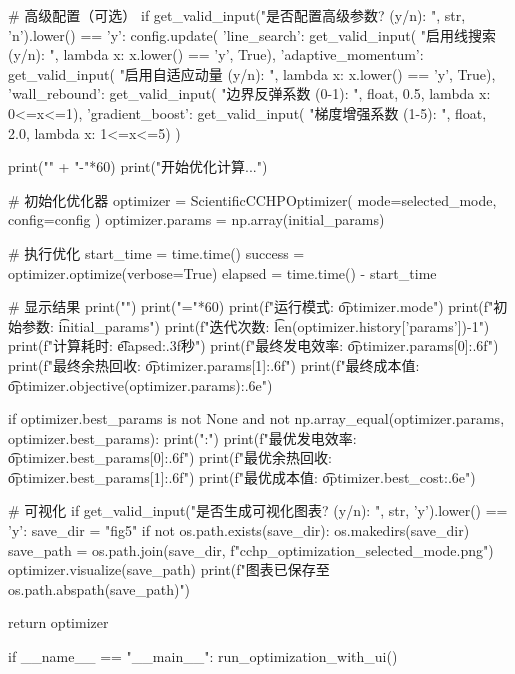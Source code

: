 \documentclass[a4paper,12pt]{article}
\begin{document}
\begin{python}
    # 高级配置（可选）
    if get_valid_input("是否配置高级参数? (y/n): ", str, 'n').lower() == 'y':
        config.update({
            'line_search': get_valid_input(
                "启用线搜索 (y/n): ", lambda x: x.lower() == 'y', True),
            'adaptive_momentum': get_valid_input(
                "启用自适应动量 (y/n): ", lambda x: x.lower() == 'y', True),
            'wall_rebound': get_valid_input(
                "边界反弹系数 (0-1): ", float, 0.5, lambda x: 0<=x<=1),
            'gradient_boost': get_valid_input(
                "梯度增强系数 (1-5): ", float, 2.0, lambda x: 1<=x<=5)
        })
    
    print("\n" + "-"*60)
    print("开始优化计算...")
    
    # 初始化优化器
    optimizer = ScientificCCHPOptimizer(
        mode=selected_mode,
        config=config
    )
    optimizer.params = np.array(initial_params)
    
    # 执行优化
    start_time = time.time()
    success = optimizer.optimize(verbose=True)
    elapsed = time.time() - start_time
    
    # 显示结果
    print("")
    print("="*60)
    print(f"运行模式: \t{optimizer.mode}")
    print(f"初始参数: \t{initial_params}")
    print(f"迭代次数: \t{len(optimizer.history['params'])-1}")
    print(f"计算耗时: \t{elapsed:.3f}秒")
    print(f"最终发电效率: \t{optimizer.params[0]:.6f}")
    print(f"最终余热回收: \t{optimizer.params[1]:.6f}")
    print(f"最终成本值: \t{optimizer.objective(optimizer.params):.6e}")
    
    if optimizer.best_params is not None and not np.array_equal(optimizer.params, optimizer.best_params):
        print(":")
        print(f"最优发电效率: \t{optimizer.best_params[0]:.6f}")
        print(f"最优余热回收: \t{optimizer.best_params[1]:.6f}")
        print(f"最优成本值: \t{optimizer.best_cost:.6e}")
    
    # 可视化
    if get_valid_input("是否生成可视化图表? (y/n): ", str, 'y').lower() == 'y':
        save_dir = "fig5"
        if not os.path.exists(save_dir):
            os.makedirs(save_dir)
        save_path = os.path.join(save_dir, f"cchp_optimization_{selected_mode}.png")
        optimizer.visualize(save_path)
        print(f"图表已保存至 {os.path.abspath(save_path)}")
    
    return optimizer

if __name__ == "__main__":
    run_optimization_with_ui()
\end{python}
\end{document}
